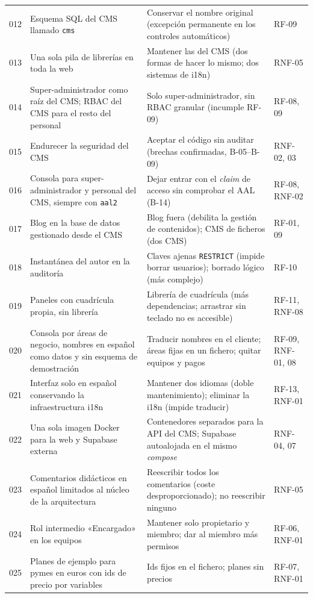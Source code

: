 \begin{longtable}{@{}l>{\raggedright\arraybackslash}p{4.3cm}>{\raggedright\arraybackslash}p{5.6cm}>{\raggedright\arraybackslash}p{2.4cm}@{}}
  012 & Esquema SQL del CMS llamado \texttt{cms} & Conservar el nombre original (excepción permanente en los controles automáticos) & RF-09 \\
  013 & Una sola pila de librerías en toda la web & Mantener las del CMS (dos formas de hacer lo mismo; dos sistemas de i18n) & RNF-05 \\
  014 & Super-administrador como raíz del CMS; RBAC del CMS para el resto del personal & Solo super-administrador, sin RBAC granular (incumple RF-09) & RF-08, 09 \\
  015 & Endurecer la seguridad del CMS & Aceptar el código sin auditar (brechas confirmadas, B-05--B-09) & RNF-02, 03 \\
  016 & Consola para super-administrador y personal del CMS, siempre con \texttt{aal2} & Dejar entrar con el \textit{claim} de acceso sin comprobar el AAL (B-14) & RF-08, RNF-02 \\
  017 & Blog en la base de datos gestionado desde el CMS & Blog fuera (debilita la gestión de contenidos); CMS de ficheros (dos CMS) & RF-01, 09 \\
  018 & Instantánea del autor en la auditoría & Claves ajenas \texttt{RESTRICT} (impide borrar usuarios); borrado lógico (más complejo) & RF-10 \\
  019 & Paneles con cuadrícula propia, sin librería & Librería de cuadrícula (más dependencias; arrastrar sin teclado no es accesible) & RF-11, RNF-08 \\
  020 & Consola por áreas de negocio, nombres en español como datos y sin esquema de demostración & Traducir nombres en el cliente; áreas fijas en un fichero; quitar equipos y pagos & RF-09, RNF-01, 08 \\
  021 & Interfaz solo en español conservando la infraestructura i18n & Mantener dos idiomas (doble mantenimiento); eliminar la i18n (impide traducir) & RF-13, RNF-01 \\
  022 & Una sola imagen Docker para la web y Supabase externa & Contenedores separados para la API del CMS; Supabase autoalojada en el mismo \textit{compose} & RNF-04, 07 \\
  023 & Comentarios didácticos en español limitados al núcleo de la arquitectura & Reescribir todos los comentarios (coste desproporcionado); no reescribir ninguno & RNF-05 \\
  024 & Rol intermedio «Encargado» en los equipos & Mantener solo propietario y miembro; dar al miembro más permisos & RF-06, RNF-01 \\
  025 & Planes de ejemplo para pymes en euros con ids de precio por variables & Ids fijos en el fichero; planes sin precios & RF-07, RNF-01 \\

\end{longtable}
